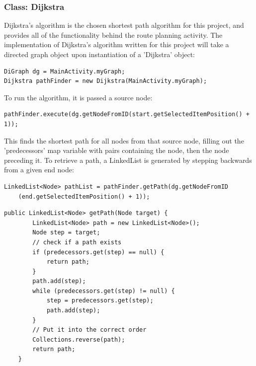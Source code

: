 \documentclass[11pt]{informatics-report}
\begin{document}
\subsubsection{Class: Dijkstra}

Dijkstra's algorithm is the chosen shortest path algorithm for this project, and provides all of the functionality behind the route planning activity. The implementation of Dijkstra's algorithm written for this project will take a directed graph object upon instantiation of a 'Dijkstra' object:

\begin{lstlisting}[frame=single]
DiGraph dg = MainActivity.myGraph;
Dijkstra pathFinder = new Dijkstra(MainActivity.myGraph);
\end{lstlisting}

To run the algorithm, it is passed a source node:

\begin{lstlisting}[frame=single]
pathFinder.execute(dg.getNodeFromID(start.getSelectedItemPosition() + 1));
\end{lstlisting}

This finds the shortest path for all nodes from that source node, filling out the 'predecessors' map variable with pairs containing the node, then the node preceding it. To retrieve a path, a LinkedList is generated by stepping backwards from a given end node:

\begin{lstlisting}[frame=single]
LinkedList<Node> pathList = pathFinder.getPath(dg.getNodeFromID
	(end.getSelectedItemPosition() + 1));
\end{lstlisting}

\begin{lstlisting}[frame=single]
public LinkedList<Node> getPath(Node target) {
        LinkedList<Node> path = new LinkedList<Node>();
        Node step = target;
        // check if a path exists
        if (predecessors.get(step) == null) {
            return path;
        }
        path.add(step);
        while (predecessors.get(step) != null) {
            step = predecessors.get(step);
            path.add(step);
        }
        // Put it into the correct order
        Collections.reverse(path);
        return path;
    }
\end{lstlisting}



%
%
%
%
%
%






\appendix

%
%
\end{document}
